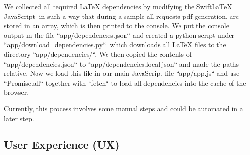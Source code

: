 We collected all required LaTeX dependencies by modifying the SwiftLaTeX JavaScript, in such a way that during a sample
all requests pdf generation, are stored in an array, which is then printed to the console.
We put the console output in the file ``app/dependencies.json`` and created a python script under ``app/download\_dependencies.py``,
which downloads all LaTeX files to the directory ``app/dependencies/``.
We then copied the contents of ``app/dependencies.json`` to ``app/dependencies.local.json`` and made the paths relative.
Now we load this file in our main JavaScript file ``app/app.js`` and use ``Promise.all`` together with ``fetch`` to load
all dependencies into the cache of the browser.

Currently, this process involves some manual steps and could be automated in a later step.

\subsection{User Experience (UX)}\label{subsec:ux}
